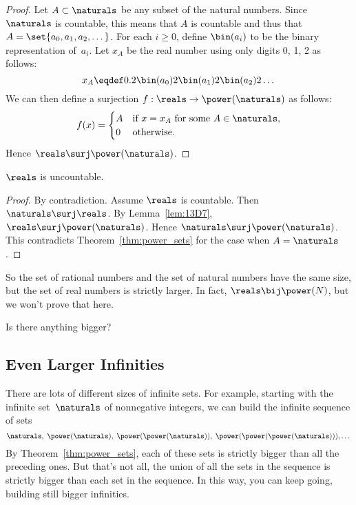 \begin{proof}
Let $A \subset \naturals$ be any subset of the natural numbers.  Since
$\naturals$ is countable, this means that $A$ is countable and thus
that $A = \set{a_0, a_1, a_2, \dots}$.  For each $i \ge 0$, define
$\bin(a_i)$ to be the binary representation of~$a_i$.  Let $x_A$ be
the real number using only digits 0, 1, 2 as follows:
\begin{equation}\label{eqn:13D9}
    x_A \eqdef 0.2 \bin(a_0) 2 \bin(a_1) 2 \bin(a_2) 2 \dots
\end{equation}
We can then define a surjection $f : \reals \to \power(\naturals)$ as
follows:
\begin{equation*}
f(x) = \begin{cases}
        A & \text{if $x = x_A$ for some $A \in \naturals$}, \\
        0 & \text{otherwise}.
       \end{cases}
\end{equation*}
Hence $\reals \surj \power(\naturals)$.
\end{proof}

\begin{corollary}\label{cor:reals_uncountable}
$\reals$ is uncountable.
\end{corollary}

\begin{proof}
By contradiction.  Assume $\reals$ is countable.  Then $\naturals
\surj \reals$.  By Lemma~\ref{lem:13D7}, $\reals \surj
\power(\naturals)$.  Hence $\naturals \surj \power(\naturals)$.  This
contradicts Theorem~\ref{thm:power_sets} for the case when $A =
\naturals$.
\end{proof}

So the set of rational numbers and the set of natural numbers have the
same size, but the set of real numbers is strictly larger.  In fact,
$\reals \bij \power(N)$, but we won't prove that here.

Is there anything bigger?

\subsection{Even Larger Infinities}

There are lots of different sizes of infinite sets.  For example,
starting with the infinite set~$\naturals$ of nonnegative integers, we
can build the infinite sequence of sets
\begin{equation*}
    \naturals, \; \power(\naturals), \; \power(\power(\naturals)), \;
    \power(\power(\power(\naturals))), \dots
\end{equation*}
By Theorem~\ref{thm:power_sets}, each of these sets is strictly bigger
than all the preceding ones.  But that's not all, the union of all the
sets in the sequence is strictly bigger than each set in the sequence.
In this way, you can keep going, building still bigger infinities.

